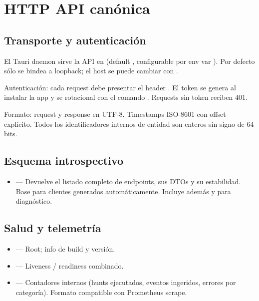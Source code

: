 \chapter{HTTP API canónica}
\label{sec:api-http}

\section{Transporte y autenticación}

El Tauri daemon sirve la API en 
(default , configurable por env var
). Por defecto sólo se bindea a
loopback; el host se puede cambiar con
.

Autenticación: cada request debe presentar el header
. El token se
genera al instalar la app y se rotacional con el comando
. Requests sin token reciben 401.

Formato: request y response en  UTF-8.
Timestamps ISO-8601 con offset explícito. Todos los identificadores
internos de entidad son enteros sin signo de 64 bits.

\section{Esquema introspectivo}

\begin{itemize}
    \item {} — Devuelve el listado completo de
    endpoints, sus DTOs y su estabilidad. Base para clientes
    generados automáticamente. Incluye además
     y  para
    diagnóstico.
\end{itemize}

\section{Salud y telemetría}

\begin{itemize}
    \item {} — Root; info de build y versión.
    \item {} — Liveness / readiness combinado.
    \item {} — Contadores internos (hunts
    ejecutados, eventos ingeridos, errores por categoría). Formato
    compatible con Prometheus scrape.
\end{itemize}

